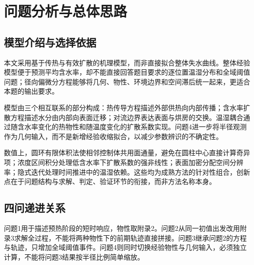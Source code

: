 \documentclass[UTF8,zihao=-4,a4paper]{ctexart}
\begin{document}
\section{问题分析与总体思路}
\subsection{模型介绍与选择依据}
本文采用基于传热与有效扩散的机理模型，而非直接拟合整体失水曲线。整体经验模型便于预测平均含水率，却不能直接回答题目要求的逐位置温湿分布和全域阈值问题；径向偏微分方程能够将几何、物性、环境边界和空间滞后统一起来，更适合本题的输出要求。

模型由三个相互联系的部分构成：热传导方程描述外部供热向内部传播；含水率扩散方程描述水分由内部向表面迁移；对流边界表达表面与烘房的交换。温湿耦合通过随含水率变化的热物性和随温度变化的扩散系数实现。问题4进一步将半径观测作为几何输入，而不是新增经验收缩拟合，以减少参数辨识的不确定性。

数值上，圆环有限体积法使相邻控制体共用面通量，避免在圆柱中心直接计算奇异项；浓度区间积分处理低含水率下扩散系数的强非线性；表面加密分配空间分辨率；隐式迭代处理时间推进中的温湿依赖。这些均为成熟方法的针对性组合，创新点在于问题结构与求解、判定、验证环节的衔接，而非方法名称本身。
\subsection{四问递进关系}
问题1用于描述预热阶段的短时响应，物性取附录2。问题2从同一初值出发改用附录3求解全过程，不能将两种物性下的前期轨迹直接拼接。问题3继承问题2的方程与轨迹，只增加全域阈值事件。问题4则同时切换经验物性与几何输入，必须独立计算，不能将问题3结果按半径比例简单缩放。
\end{document}
